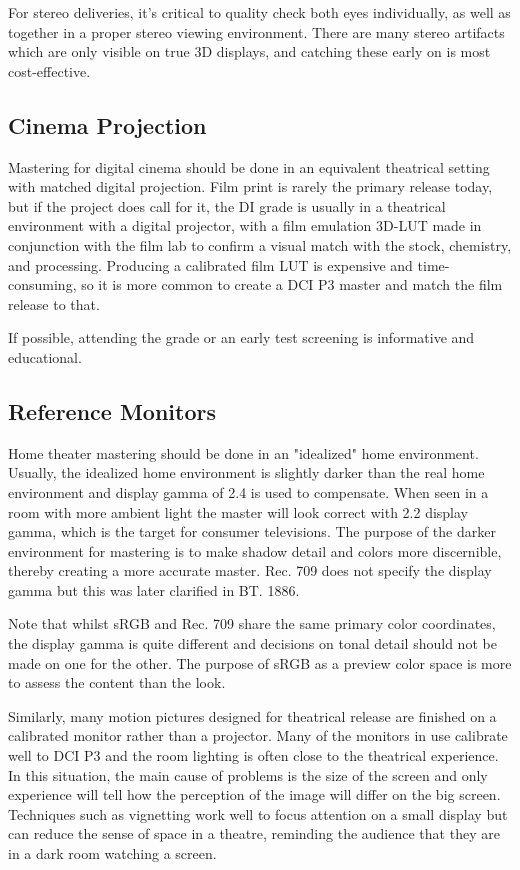 For stereo deliveries, it's critical to quality check both eyes individually, as well as together in a proper stereo viewing environment. There are many stereo artifacts which are only visible on true 3D displays, and catching these early on is most cost-effective.

\subsection{Cinema Projection}%
\label{subsec:cinema-projection}

Mastering for digital cinema should be done in an equivalent theatrical setting with matched digital projection. Film print is rarely the primary release today, but if the project does call for it, the DI grade is usually in a theatrical environment with a digital projector, with a film emulation 3D-LUT made in conjunction with the film lab to confirm a visual match with the stock, chemistry, and processing. Producing a calibrated film LUT is expensive and time-consuming, so it is more common to create a DCI P3 master and match the film release to that.

If possible, attending the grade or an early test screening is informative and educational.

\subsection{Reference Monitors}%
\label{subsec:reference-monitors}

Home theater mastering should be done in an "idealized" home environment. Usually, the idealized home environment is slightly darker than the real home environment and display gamma of 2.4 is used to compensate. When seen in a room with more ambient light the master will look correct with 2.2 display gamma, which is the target for consumer televisions. The purpose of the darker environment for mastering is to make shadow detail and colors more discernible, thereby creating a more accurate master. Rec. 709 does not specify the display gamma but this was later clarified in BT. 1886.

Note that whilst sRGB and Rec. 709 share the same primary color coordinates, the display gamma is quite different and decisions on tonal detail should not be made on one for the other. The purpose of sRGB as a preview color space is more to assess the content than the look.

Similarly, many motion pictures designed for theatrical release are finished on a calibrated monitor rather than a projector. Many of the monitors in use calibrate well to DCI P3 and the room lighting is often close to the theatrical experience. In this situation, the main cause of problems is the size of the screen and only experience will tell how the perception of the image will differ on the big screen. Techniques such as vignetting work well to focus attention on a small display but can reduce the sense of space in a theatre, reminding the audience that they are in a dark room watching a screen.

